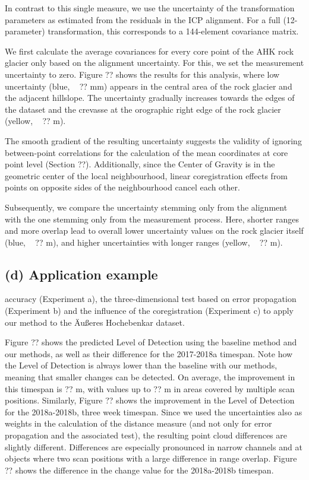 \documentclass[preprint,12pt,3p]{elsarticle}
\begin{document}
In contrast to this single measure, we use the uncertainty of the transformation parameters as estimated from the residuals in the ICP alignment. For a full (12-parameter) transformation, this corresponds to a 144-element covariance matrix. 

We first calculate the average covariances for every core point of the AHK rock glacier only based on the alignment uncertainty. For this, we set the measurement uncertainty to zero. Figure ?? shows the results for this analysis, where low uncertainty (blue, ~ ?? mm) appears in the central area of the rock glacier and the adjacent hillslope. The uncertainty gradually increases towards the edges of the dataset and the crevasse at the orographic right edge of the rock glacier (yellow, ~ ?? m).

The smooth gradient of the resulting uncertainty suggests the validity of ignoring between-point correlations for the calculation of the mean coordinates at core point level (Section ??). Additionally, since the Center of Gravity is in the geometric center of the local neighbourhood, linear coregistration effects from points on opposite sides of the neighbourhood cancel each other.

Subsequently, we compare the uncertainty stemming only from the alignment with the one stemming only from the measurement process. Here, shorter ranges and more overlap lead to overall lower uncertainty values on the rock glacier itself (blue, ~ ?? m), and higher uncertainties with longer ranges (yellow, ~ ?? m).


\subsection{(d) Application example}
accuracy (Experiment a), the three-dimensional test based on error propagation (Experiment b) and the influence of the coregistration (Experiment c) to apply our method to the Äußeres Hochebenkar dataset.

Figure ?? shows the predicted Level of Detection using the baseline method and our methods, as well as their difference for the 2017-2018a timespan. Note how the Level of Detection is always lower than the baseline with our methods, meaning that smaller changes can be detected. On average, the improvement in this timespan is ?? m, with values up to ?? m in areas covered by multiple scan positions. Similarly, Figure ?? shows the improvement in the Level of Detection for the 2018a-2018b, three week timespan. 
Since we used the uncertainties also as weights in the calculation of the distance measure (and not only for error propagation and the associated test), the resulting point cloud differences are slightly different. Differences are especially pronounced in narrow channels and at objects where two scan positions with a large difference in range overlap. Figure ?? shows the difference in the change value for the 2018a-2018b timespan.
 
\end{document}
